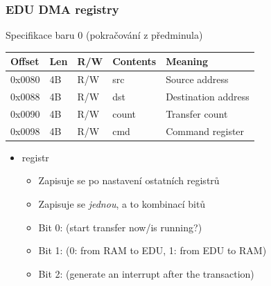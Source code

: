 \begin{frame}
  \frametitle{EDU DMA registry}

\begin{block}{Specifikace baru 0 (pokračování z předminula)}
\begin{center}
\begin{table}
\footnotesize
\begin{tabular}{|l|l|l|l|l|} \hline
Offset & Len & R/W & Contents & Meaning \\ \hline\hline
0x0080 & 4B  & R/W & src      & Source address \\ \hline
0x0088 & 4B  & R/W & dst      & Destination address \\ \hline
0x0090 & 4B  & R/W & count    & Transfer count \\ \hline
0x0098 & 4B  & R/W & cmd      & Command register \\ \hline
\end{tabular}
\end{table}
\end{center}
\end{block}

  \pause

  \begin{itemize}
    \item {} registr
    \begin{itemize}
      \item Zapisuje se po nastavení ostatních registrů
      \item Zapisuje se \emph{jednou}, a to kombinací bitů
      \item Bit 0:  (start transfer now/is running?)
      \item Bit 1:  (0: from RAM to EDU, 1: from EDU to RAM)
      \item Bit 2:  (generate an interrupt after the transaction)
    \end{itemize}
  \end{itemize}

\end{frame}

